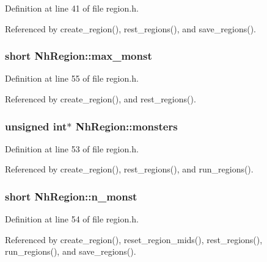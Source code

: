 Definition at line 41 of file region.\+h.



Referenced by create\+\_\+region(), rest\+\_\+regions(), and save\+\_\+regions().

\hypertarget{structNhRegion_a26e6ec350a157299cdd03820faf5948b}{
\subsubsection[{max\+\_\+monst}]{\setlength{\rightskip}{0pt plus 5cm}short Nh\+Region\+::max\+\_\+monst}}\label{structNhRegion_a26e6ec350a157299cdd03820faf5948b}


Definition at line 55 of file region.\+h.



Referenced by create\+\_\+region(), and rest\+\_\+regions().

\hypertarget{structNhRegion_a22e5c3cedd81f1f8f83ee6badc4e0ceb}{
\subsubsection[{monsters}]{\setlength{\rightskip}{0pt plus 5cm}unsigned int$\ast$ Nh\+Region\+::monsters}}\label{structNhRegion_a22e5c3cedd81f1f8f83ee6badc4e0ceb}


Definition at line 53 of file region.\+h.



Referenced by create\+\_\+region(), rest\+\_\+regions(), and run\+\_\+regions().

\hypertarget{structNhRegion_a03e540a957b87fbd016dbee3c3c0cb9c}{
\subsubsection[{n\+\_\+monst}]{\setlength{\rightskip}{0pt plus 5cm}short Nh\+Region\+::n\+\_\+monst}}\label{structNhRegion_a03e540a957b87fbd016dbee3c3c0cb9c}


Definition at line 54 of file region.\+h.



Referenced by create\+\_\+region(), reset\+\_\+region\+\_\+mids(), rest\+\_\+regions(), run\+\_\+regions(), and save\+\_\+regions().

